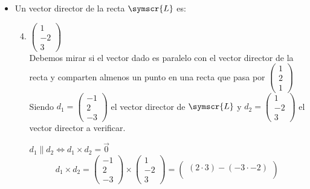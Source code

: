 \documentclass{article}
\def\fancyL{\symscr{L}}
\begin{document}
\begin{enumerate}
        \begin{itemize}
            \item Un vector director de la recta \(\fancyL\) es:
                \begin{enumerate}[label=\listAlph]
                    \setcounter{enumii}{3}
					\item \(\begin{pmatrix}1 \\ -2 \\ 3\end{pmatrix}\) \\
                        Debemos mirar si el vector dado es paralelo con el vector director de la recta y comparten almenos un punto en una recta que pasa por \(\left(\begin{smallmatrix}1 \\ 2 \\ 1\end{smallmatrix}\right)\)
                        Siendo \(d_1 = \begin{pmatrix}-1 \\ 2 \\ -3\end{pmatrix}\) el vector director de \(\fancyL\) y \(d_2 = \begin{pmatrix}1 \\ -2 \\ 3\end{pmatrix}\) el vector director a verificar.
                        \ResetCases{}    
                        \begin{mathcase}{\(d_1 \parallel d_2 \iff d_1 \times d_2 = \vec{0}\)}  
                            \[
                                    d_1 \times d_2 =
                                    \begin{pmatrix}
                                        -1 \\ 2 \\ -3
                                    \end{pmatrix}
                                    \times
                                    \begin{pmatrix}
                                        1 \\ -2 \\ 3
                                    \end{pmatrix}
                                    =
                                    \begin{pmatrix}
                                        (2 \cdot 3) - (-3 \cdot -2) \\

\end{pmatrix}\]
\end{mathcase}
\end{enumerate}
\end{itemize}
\end{enumerate}
\end{document}
